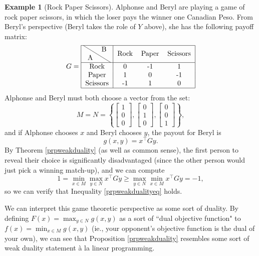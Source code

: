 \documentclass[11pt]{article}
\numberwithin{equation}{section}
\theoremstyle{definition}
\newtheorem{example}[theorem]{Example}
\begin{document}
\begin{example}[Rock Paper Scissors]
    Alphonse and Beryl are playing a game of rock paper scissors, in which the loser pays the winner one Canadian Peso. From Beryl's perspective (Beryl takes the role of $Y$ above), she has the following payoff matrix:
    \begin{equation}
        G=\begin{tabular}{|c|ccc|}
            \hline
                \backslashbox{A}{B}&Rock&Paper&Scissors\\\hline 
                Rock & 0 & -1 & 1 \\
                Paper & 1 & 0 & -1 \\
                Scissors & -1 & 1 & 0\\\hline
            \end{tabular}
    \end{equation}
    Alphonse and Beryl must both choose a vector from the set:
    \begin{equation}
        M=N=\left\{\begin{bmatrix} 1\\ 0\\ 0\end{bmatrix},
        \begin{bmatrix} 0\\ 1\\ 0\end{bmatrix},
        \begin{bmatrix} 0\\ 0\\ 1\end{bmatrix}\right\},
    \end{equation}
    and if Alphonse chooses $x$ and Beryl chooses $y$, the payout for Beryl is
    \begin{equation}
        g(x,y)=x^\top Gy.
    \end{equation}
    By Theorem \ref{prpweakduality} (as well as common sense), the first person to reveal their choice is significantly disadvantaged (since the other person would just pick a winning match-up), and we can compute
    \begin{equation}
        1=\min_{x\in M}\max_{y\in N} x^\top Gy\ge \max_{y\in N}\min_{x\in M} x^\top Gy=-1,
    \end{equation}
    so we can verify that Inequality \ref{prpweakdualityeq} holds.
\end{example}

We can interpret this game theoretic perspective as some sort of duality. By defining  $F(x)=\max_{y\in N}g(x,y)$ as a sort of ``dual objective function" to $f(x)=\min_{x\in M} g(x,y)$ (ie., your opponent's objective function is the dual of your own), we can see that Proposition \ref{prpweakduality} resembles some sort of weak duality statement \`a la linear programming.
\end{document}
